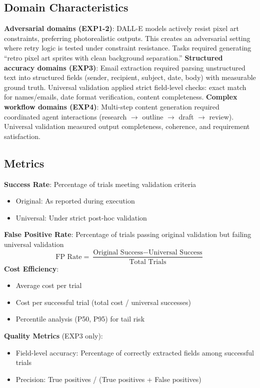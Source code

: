 \documentclass{article}
\begin{document}
\subsection{Domain Characteristics}
\textbf{Adversarial domains (EXP1-2)}: DALL-E models actively resist pixel art constraints, preferring photorealistic outputs. This creates an adversarial setting where retry logic is tested under constraint resistance. Tasks required generating ``retro pixel art sprites with clean background separation.''
\textbf{Structured accuracy domains (EXP3)}: Email extraction required parsing unstructured text into structured fields (sender, recipient, subject, date, body) with measurable ground truth. Universal validation applied strict field-level checks: exact match for names/emails, date format verification, content completeness.
\textbf{Complex workflow domains (EXP4)}: Multi-step content generation required coordinated agent interactions (research $\rightarrow$ outline $\rightarrow$ draft $\rightarrow$ review). Universal validation measured output completeness, coherence, and requirement satisfaction.

\subsection{Metrics}
\textbf{Success Rate}: Percentage of trials meeting validation criteria
\begin{itemize}
\item Original: As reported during execution
\item Universal: Under strict post-hoc validation
\end{itemize}
\textbf{False Positive Rate}: Percentage of trials passing original validation but failing universal validation
\begin{equation}
\text{FP Rate} = \frac{\text{Original Success} - \text{Universal Success}}{\text{Total Trials}}
\end{equation}
\textbf{Cost Efficiency}:
\begin{itemize}
\item Average cost per trial
\item Cost per successful trial (total cost / universal successes)
\item Percentile analysis (P50, P95) for tail risk
\end{itemize}
\textbf{Quality Metrics} (EXP3 only):
\begin{itemize}
\item Field-level accuracy: Percentage of correctly extracted fields among successful trials
\item Precision: True positives / (True positives + False positives)
\end{itemize}
\end{document}

